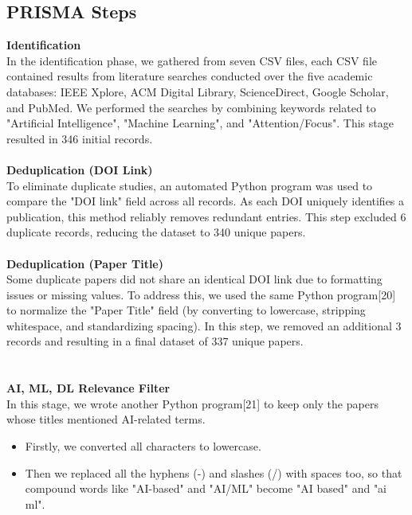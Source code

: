 \documentclass[twocolumn,12pt]{article}
\begin{document}
\subsection{PRISMA Steps}
\textbf{Identification} \\ 
In the identification phase, we gathered from seven CSV files, each CSV file contained results from literature searches conducted over the five academic databases: IEEE Xplore, ACM Digital Library, ScienceDirect, Google Scholar, and PubMed. We performed the searches by combining keywords related to "Artificial Intelligence", "Machine Learning", and "Attention/Focus". This stage resulted in 346 initial records. \\ \\
\textbf{Deduplication (DOI Link)} \\ 
To eliminate duplicate studies, an automated Python program was used to compare the "DOI link" field across all records. As each DOI uniquely identifies a publication, this method reliably removes redundant entries. This step excluded 6 duplicate records, reducing the dataset to 340 unique papers. \\ \\
\textbf{Deduplication (Paper Title)} \\ 
Some duplicate papers did not share an identical DOI link due to formatting issues or missing values. To address this, we used the same Python program[20] to normalize the "Paper Title" field (by converting to lowercase, stripping whitespace, and standardizing spacing). In this step, we removed an additional 3 records and resulting in a final dataset of 337 unique papers. \\ \\ \\
\textbf{AI, ML, DL Relevance Filter} \\ 
In this stage, we wrote another Python program[21] to keep only the papers whose titles mentioned AI-related terms. 
\begin{itemize}
    \item Firstly, we converted all characters to lowercase.
    \item Then we replaced all the hyphens (-) and slashes (/) with spaces too, so that compound words like "AI-based" and "AI/ML" become "AI based" and "ai ml".
\end{itemize}
\end{document}
